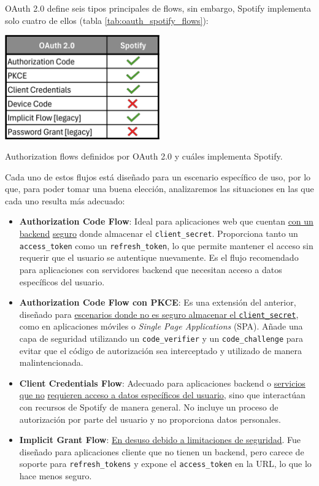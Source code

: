 OAuth 2.0 define seis tipos principales de flows, sin embargo, Spotify implementa solo cuatro de ellos (tabla \ref{tab:oauth_spotify_flows}):

\begin{table}[H]
    \centering
    \includegraphics[width=0.5\textwidth]{figures/oauth_vs_spotify_flows.png}
    \caption{Authorization flows definidos por OAuth 2.0 y cuáles implementa Spotify.}
    \label{tab:oauth_spotify_flows}
\end{table}

Cada uno de estos flujos está diseñado para un escenario específico de uso, por lo que, para poder tomar una buena elección, analizaremos las situaciones en las que cada uno resulta más adecuado:

\begin{itemize}
    \item \textbf{Authorization Code Flow}: Ideal para aplicaciones web que cuentan \underline{con un backend} \underline{seguro} donde almacenar el \texttt{client\_secret}. Proporciona tanto un \texttt{access\_token} como un \texttt{refresh\_token}, lo que permite mantener el acceso sin requerir que el usuario se autentique nuevamente. Es el flujo recomendado para aplicaciones con servidores backend que necesitan acceso a datos específicos del usuario.

    \item \textbf{Authorization Code Flow con PKCE}: Es una extensión del anterior, diseñado para \underline{escenarios donde no es seguro almacenar el \texttt{client\_secret}}, como en aplicaciones móviles o \textit{Single Page Applications} (SPA). Añade una capa de seguridad utilizando un \texttt{code\_verifier} y un \texttt{code\_challenge} para evitar que el código de autorización sea interceptado y utilizado de manera malintencionada.

    \item \textbf{Client Credentials Flow}: Adecuado para aplicaciones backend o \underline{servicios que no} \underline{requieren acceso a datos específicos del usuario}, sino que interactúan con recursos de Spotify de manera general. No incluye un proceso de autorización por parte del usuario y no proporciona datos personales.

    \item \textbf{Implicit Grant Flow}: \underline{En desuso debido a limitaciones de seguridad}. Fue diseñado para aplicaciones cliente que no tienen un backend, pero carece de soporte para \texttt{refresh\_tokens} y expone el \texttt{access\_token} en la URL, lo que lo hace menos seguro.
\end{itemize}

